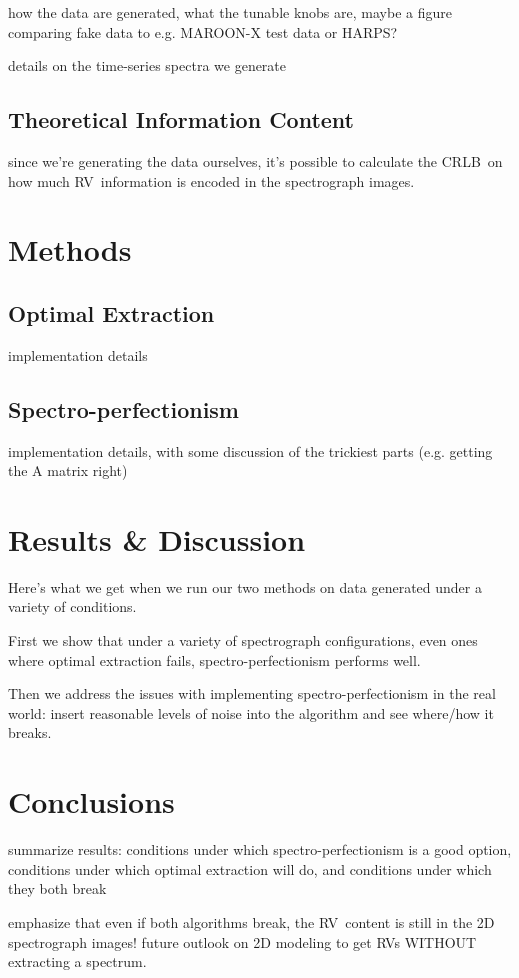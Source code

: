 \documentclass[modern]{aastex61}
\newcommand{\acronym}[1]{{\small{#1}}}
\newcommand{\RV}{\acronym{RV}}
\newcommand{\CRLB}{\acronym{CRLB}}
\begin{document}
how the data are generated, what the tunable knobs are, maybe a figure comparing fake data to e.g. MAROON-X test data or HARPS?




details on the time-series spectra we generate

\subsection{Theoretical Information Content}
since we're generating the data ourselves, it's possible to calculate the \CRLB\ on how much \RV\ information is encoded in the spectrograph images.

\section{Methods}
\subsection{Optimal Extraction}
implementation details

\subsection{Spectro-perfectionism}
implementation details, with some discussion of the trickiest parts (e.g. getting the A matrix right)

\section{Results \& Discussion}
Here's what we get when we run our two methods on data generated under a variety of conditions.

First we show that under a variety of spectrograph configurations, even ones where optimal extraction fails, spectro-perfectionism performs well.

Then we address the issues with implementing spectro-perfectionism in the real world: insert reasonable levels of noise into the algorithm and see where/how it breaks.

\section{Conclusions}

summarize results: conditions under which spectro-perfectionism is a good option, conditions under which optimal extraction will do, and conditions under which they both break

emphasize that even if both algorithms break, the \RV\ content is still in the 2D spectrograph images! future outlook on 2D modeling to get \RV s WITHOUT extracting a spectrum.




\end{document}
